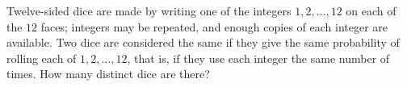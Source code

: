 Twelve-sided dice are made by writing one of the integers $1,2,\dots,12$ on each of the $12$ faces; integers may be repeated, and enough copies of each integer are available. Two dice are considered the same if they give the same probability of rolling each of $1,2,\dots,12$, that is, if they use each integer the same number of times. How many distinct dice are there?
